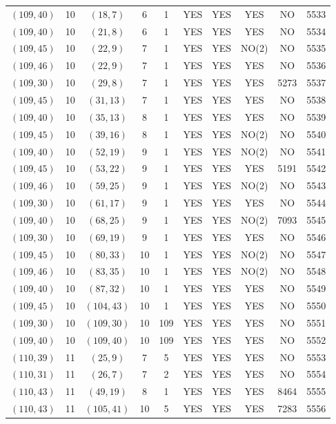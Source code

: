 \begin{longtable}{|c|c|c|c|c|c|c|c|c|c|}
$(109, 40)$ & 10 & $(18, 7)$ & 6 & 1 & YES & YES & YES & NO & 5533\\
$(109, 40)$ & 10 & $(21, 8)$ & 6 & 1 & YES & YES & YES & NO & 5534\\
$(109, 45)$ & 10 & $(22, 9)$ & 7 & 1 & YES & YES & NO(2) & NO & 5535\\
$(109, 46)$ & 10 & $(22, 9)$ & 7 & 1 & YES & YES & YES & NO & 5536\\
$(109, 30)$ & 10 & $(29, 8)$ & 7 & 1 & YES & YES & YES & 5273 & 5537\\
$(109, 45)$ & 10 & $(31, 13)$ & 7 & 1 & YES & YES & YES & NO & 5538\\
$(109, 40)$ & 10 & $(35, 13)$ & 8 & 1 & YES & YES & YES & NO & 5539\\
$(109, 45)$ & 10 & $(39, 16)$ & 8 & 1 & YES & YES & NO(2) & NO & 5540\\
$(109, 40)$ & 10 & $(52, 19)$ & 9 & 1 & YES & YES & NO(2) & NO & 5541\\
$(109, 45)$ & 10 & $(53, 22)$ & 9 & 1 & YES & YES & YES & 5191 & 5542\\
$(109, 46)$ & 10 & $(59, 25)$ & 9 & 1 & YES & YES & NO(2) & NO & 5543\\
$(109, 30)$ & 10 & $(61, 17)$ & 9 & 1 & YES & YES & YES & NO & 5544\\
$(109, 40)$ & 10 & $(68, 25)$ & 9 & 1 & YES & YES & NO(2) & 7093 & 5545\\
$(109, 30)$ & 10 & $(69, 19)$ & 9 & 1 & YES & YES & YES & NO & 5546\\
$(109, 45)$ & 10 & $(80, 33)$ & 10 & 1 & YES & YES & NO(2) & NO & 5547\\
$(109, 46)$ & 10 & $(83, 35)$ & 10 & 1 & YES & YES & NO(2) & NO & 5548\\
$(109, 40)$ & 10 & $(87, 32)$ & 10 & 1 & YES & YES & YES & NO & 5549\\
$(109, 45)$ & 10 & $(104, 43)$ & 10 & 1 & YES & YES & YES & NO & 5550\\
$(109, 30)$ & 10 & $(109, 30)$ & 10 & 109 & YES & YES & YES & NO & 5551\\
$(109, 40)$ & 10 & $(109, 40)$ & 10 & 109 & YES & YES & YES & NO & 5552\\
$(110, 39)$ & 11 & $(25, 9)$ & 7 & 5 & YES & YES & YES & NO & 5553\\
$(110, 31)$ & 11 & $(26, 7)$ & 7 & 2 & YES & YES & YES & NO & 5554\\
$(110, 43)$ & 11 & $(49, 19)$ & 8 & 1 & YES & YES & YES & 8464 & 5555\\
$(110, 43)$ & 11 & $(105, 41)$ & 10 & 5 & YES & YES & YES & 7283 & 5556\\

\end{longtable}
